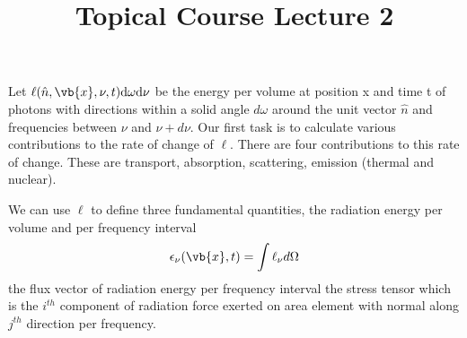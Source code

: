 \documentclass{../template/texnote}
\title{Topical Course Lecture 2}
\begin{document}
    \maketitle {}

Let $\ell(\hat{n}, \vb{x}, \nu, t) \mathrm{d}\omega \mathrm{d}\nu$ be the energy per volume at position x and time t of photons with directions within a solid angle $d\omega$ around the unit vector $\hat{n}$ and frequencies between $\nu$ and $\nu + d\nu$.
Our first task is to calculate various contributions to the rate of change of $\ell$.
There are four contributions to this rate of change.
These are transport, absorption, scattering, emission (thermal and nuclear).

We can use $\ell$ to define
three fundamental quantities, the radiation energy per volume and per frequency interval
\[
    \epsilon_\nu(\vb{x},t) = \int{\ell_\nu d\Omega}
\]
the flux vector of radiation energy per frequency interval
the stress tensor which is the $i^{th}$ component of radiation force exerted on area element with normal along $j^{th}$ direction per frequency.

    \printbibliography
\end{document}
